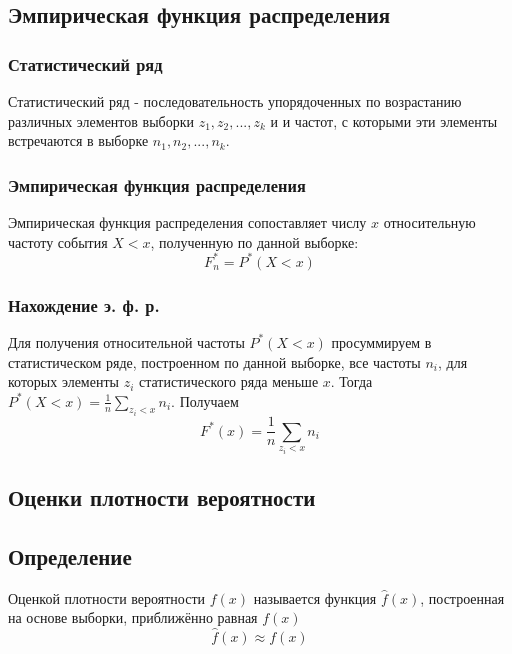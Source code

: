 \subsection {Эмпирическая функция распределения}
	\subsubsection {Статистический ряд}
		Статистический ряд - последовательность упорядоченных по возрастанию различных элементов выборки $z_1, z_2, ..., z_k$ и и частот, с которыми эти элементы встречаются в выборке $n_1, n_2, ..., n_k$. 

	\subsubsection {Эмпирическая функция распределения}
		Эмпирическая функция распределения сопоставляет числу $x$ относительную частоту события $X<x$, полученную по данной выборке:\\
	\begin{equation} F_n^* = P^*(X<x)\end{equation}

	\subsubsection {Нахождение э. ф. р.}
		Для получения относительной частоты $P^*(X<x)$ просуммируем в статистическом ряде, построенном по данной выборке, все частоты $n_i$, для которых элементы $z_i$ статистического ряда меньше $x$. Тогда $P^*(X<x) = \frac{1}{n} \sum_{z_i<x}n_i$. Получаем\\
	\begin{equation} F^*(x) = \frac{1}{n}\sum_{z_i<x} n_i\end{equation}

\subsection {Оценки плотности вероятности}
	\subsection {Определение}
		Оценкой плотности вероятности $f(x)$ называется функция $\hat{f}(x)$, построенная на основе выборки, приближённо равная $f(x)$\\
		\begin{equation} \hat{f}(x) \approx f(x) \end{equation}

